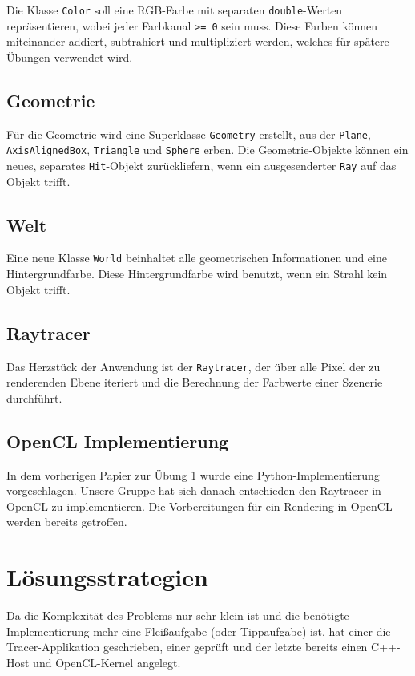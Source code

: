 \documentclass[tog]{acmsiggraph}
\newcommand{\code}[1]{\texttt{#1}}
\begin{document}
Die Klasse \code{Color} soll eine RGB-Farbe mit separaten \code{double}-Werten repräsentieren, wobei jeder Farbkanal \code{>= 0} sein muss. Diese Farben können miteinander addiert, subtrahiert und multipliziert werden, welches für spätere Übungen verwendet wird.

\subsection{Geometrie}

Für die Geometrie wird eine Superklasse \code{Geometry} erstellt, aus der \code{Plane}, \code{AxisAlignedBox}, \code{Triangle} und \code{Sphere} erben. Die Geometrie-Objekte können ein neues, separates \code{Hit}-Objekt zurückliefern, wenn ein ausgesenderter \code{Ray} auf das Objekt trifft.

\subsection{Welt}

Eine neue Klasse \code{World} beinhaltet alle geometrischen Informationen und eine Hintergrundfarbe. Diese Hintergrundfarbe wird benutzt, wenn ein Strahl kein Objekt trifft.

\subsection{Raytracer}

Das Herzstück der Anwendung ist der \code{Raytracer}, der über alle Pixel der zu renderenden Ebene iteriert und die Berechnung der Farbwerte einer Szenerie durchführt.

\subsection{OpenCL Implementierung}

In dem vorherigen Papier zur Übung 1 wurde eine Python-Implementierung vorgeschlagen. Unsere Gruppe hat sich danach entschieden den Raytracer in OpenCL zu implementieren. Die Vorbereitungen für ein Rendering in OpenCL werden bereits getroffen.

\section{Lösungsstrategien}

Da die Komplexität des Problems nur sehr klein ist und die benötigte Implementierung mehr eine Fleißaufgabe (oder Tippaufgabe) ist, hat einer die Tracer-Applikation geschrieben, einer geprüft und der letzte bereits einen C++-Host und OpenCL-Kernel angelegt.
\end{document}
